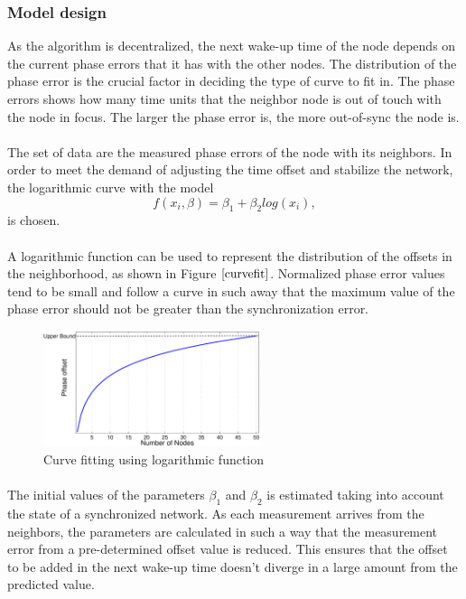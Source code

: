 \documentclass[a4paper,10pt]{report}
\begin{document}
\subsubsection{Model design}
As the algorithm is decentralized, the next wake-up time of the node depends on the current phase errors that it has with the other nodes. The distribution of the phase error is the crucial factor in deciding the type of curve to fit in. The phase errors shows how many time units that the neighbor node is out of touch with the node in focus. The larger the phase error is, the more out-of-sync the node is.\paragraph*{}
The set of data are the measured phase errors of the node with its neighbors.  In order to meet the demand of adjusting the time offset and stabilize the network, the logarithmic curve with the model
\begin{equation}
 f(x_i,\beta)= \beta _1 + \beta_2log(x_i),
\end{equation}
is chosen. \paragraph*{}
A logarithmic function can be used to represent the distribution of the offsets in the neighborhood, as shown in Figure $\ref{curvefit}$.
Normalized phase error values tend to be small and follow a curve in such away that the maximum value of the phase error should not be greater than the synchronization error.
\begin{figure}
\centering
\includegraphics[width=2.5in]{curvefit}
\caption{Curve fitting using logarithmic function} \label{curvefit}
\end{figure}
\paragraph*{}
The initial values of the parameters $\beta_1$ and $\beta_2$ is estimated taking into account the state of a synchronized network. As each measurement arrives from the neighbors, the parameters are calculated in such a way that the measurement error from a pre-determined offset value is reduced. This ensures that the offset to be added in the next wake-up time doesn't diverge in a large amount from the predicted value.
\end{document}
